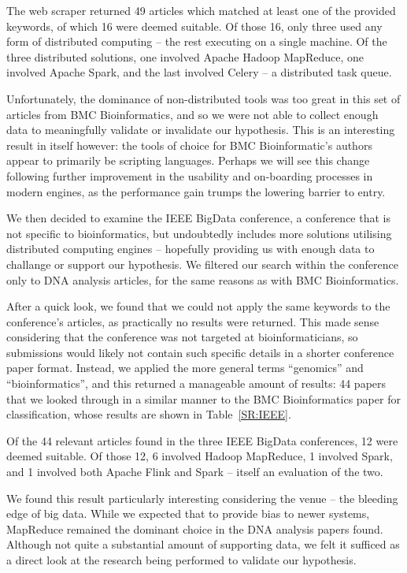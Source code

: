   The web scraper returned 49 articles which matched at least one of the provided keywords, of which 16 were deemed suitable. Of those 16, only three used any form of distributed computing -- the rest executing on a single machine. Of the three distributed solutions, one involved Apache Hadoop MapReduce, one involved Apache Spark, and the last involved Celery -- a distributed task queue.

  Unfortunately, the dominance of non-distributed tools was too great in this set of articles from BMC Bioinformatics, and so we were not able to collect enough data to meaningfully validate or invalidate our hypothesis. This is an interesting result in itself however: the tools of choice for BMC Bioinformatic's authors appear to primarily be scripting languages. Perhaps we will see this change following further improvement in the usability and on-boarding processes in modern engines, as the performance gain trumps the lowering barrier to entry.

  We then decided to examine the IEEE BigData conference, a conference that is not specific to bioinformatics, but undoubtedly includes more solutions utilising distributed computing engines -- hopefully providing us with enough data to challange or support our hypothesis. We filtered our search within the conference only to DNA analysis articles, for the same reasons as with BMC Bioinformatics.

  After a quick look, we found that we could not apply the same keywords to the conference's articles, as practically no results were returned. This made sense considering that the conference was not targeted at bioinformaticians, so submissions would likely not contain such specific details in a shorter conference paper format. Instead, we applied the more general terms ``genomics'' and ``bioinformatics'', and this returned a manageable amount of results: 44 papers that we looked through in a similar manner to the BMC Bioinformatics paper for classification, whose results are shown in Table~\ref{SR:IEEE}.

  Of the 44 relevant articles found in the three IEEE BigData conferences, 12 were deemed suitable. Of those 12, 6 involved Hadoop MapReduce, 1 involved Spark, and 1 involved both Apache Flink and Spark -- itself an evaluation of the two.

  We found this result particularly interesting considering the venue -- the bleeding edge of big data. While we expected that to provide bias to newer systems, MapReduce remained the dominant choice in the DNA analysis papers found. Although not quite a substantial amount of supporting data, we felt it sufficed as a direct look at the research being performed to validate our hypothesis. 